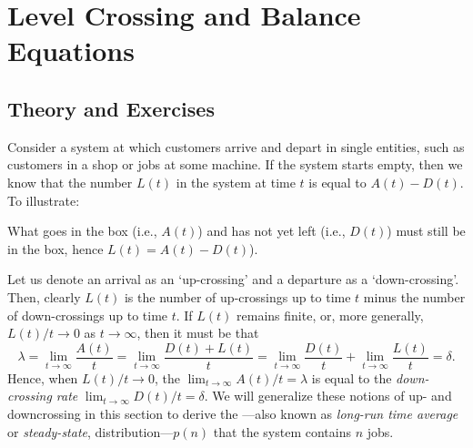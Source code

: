 \section{Level Crossing and Balance Equations}
\label{sec:level-cross-balance}


\subsection*{Theory and Exercises}



Consider a system at which customers arrive and depart in single
entities, such as customers in a shop or jobs at some machine.  If the
system starts empty, then we know that the number $L(t)$ in the system
at time $t$ is equal to $A(t) - D(t)$. To illustrate:

\begin{figure}[h]
  \centering
{}
\end{figure}

\noindent What goes in the box (i.e., $A(t)$) and has not yet left
  (i.e., $D(t)$) must still be in the box, hence $L(t)=A(t)-D(t)$). 



Let us denote an arrival as an `up-crossing' and a departure as a
`down-crossing'.  Then, clearly $L(t)$ is the number of up-crossings
up to time $t$ minus the number of down-crossings up to time $t$. If
$L(t)$ remains finite, or, more generally, $L(t)/t \to 0$ as $t\to\infty$, then it
must be that
\begin{equation*}
  \lambda =  \lim_{t \to \infty} \frac{A(t)}t  = \lim_{t \to \infty} \frac{D(t)+L(t)}t =  \lim_{t \to \infty} \frac{D(t)}t + \lim_{t \to \infty} \frac{L(t)}t 
  = \delta.  
\end{equation*}
Hence, when $L(t)/t\to0$, the 
$\lim_{t \to \infty} A(t)/t = \lambda$ is equal to the \emph{down-crossing rate}
$\lim_{t \to \infty} D(t)/t = \delta$.  We will generalize these notions of up- and
downcrossing in this section to derive the ---also known as \emph{long-run time average} or \emph{steady-state},
distribution---$p(n)$ that the system contains $n$ jobs. 

